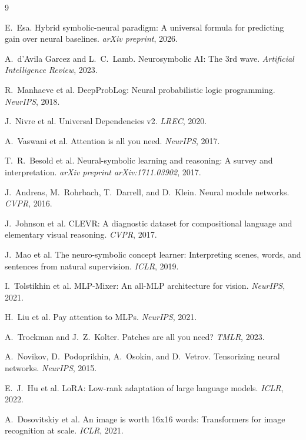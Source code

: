 \documentclass[11pt,a4paper]{article}
\begin{document}

\begin{thebibliography}{9}

E.~Esa. Hybrid symbolic-neural paradigm: A universal formula for
predicting gain over neural baselines. \emph{arXiv preprint}, 2026.

A.~d'Avila Garcez and L.~C.~Lamb. Neurosymbolic AI: The 3rd wave.
\emph{Artificial Intelligence Review}, 2023.

R.~Manhaeve et al. DeepProbLog: Neural probabilistic logic programming.
\emph{NeurIPS}, 2018.

J.~Nivre et al. Universal Dependencies v2. \emph{LREC}, 2020.

A.~Vaswani et al. Attention is all you need. \emph{NeurIPS}, 2017.

T.~R.~Besold et al. Neural-symbolic learning and reasoning: A survey
and interpretation. \emph{arXiv preprint arXiv:1711.03902}, 2017.

J.~Andreas, M.~Rohrbach, T.~Darrell, and D.~Klein. Neural module
networks. \emph{CVPR}, 2016.

J.~Johnson et al. CLEVR: A diagnostic dataset for compositional
language and elementary visual reasoning. \emph{CVPR}, 2017.

J.~Mao et al. The neuro-symbolic concept learner: Interpreting
scenes, words, and sentences from natural supervision. \emph{ICLR}, 2019.

I.~Tolstikhin et al. MLP-Mixer: An all-MLP architecture for vision.
\emph{NeurIPS}, 2021.

H.~Liu et al. Pay attention to MLPs. \emph{NeurIPS}, 2021.

A.~Trockman and J.~Z.~Kolter. Patches are all you need?
\emph{TMLR}, 2023.

A.~Novikov, D.~Podoprikhin, A.~Osokin, and D.~Vetrov. Tensorizing
neural networks. \emph{NeurIPS}, 2015.

E.~J.~Hu et al. LoRA: Low-rank adaptation of large language models.
\emph{ICLR}, 2022.

A.~Dosovitskiy et al. An image is worth 16x16 words: Transformers
for image recognition at scale. \emph{ICLR}, 2021.


\end{thebibliography}
\end{document}
